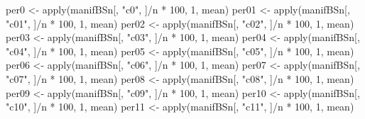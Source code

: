 \documentclass[
]{book}
\newenvironment{Shaded}{\begin{snugshade}}{\end{snugshade}}
\newcommand{\DecValTok}[1]{\textcolor[rgb]{0.00,0.00,0.81}{#1}}
\newcommand{\FunctionTok}[1]{\textcolor[rgb]{0.00,0.00,0.00}{#1}}
\newcommand{\NormalTok}[1]{#1}
\newcommand{\OtherTok}[1]{\textcolor[rgb]{0.56,0.35,0.01}{#1}}
\newcommand{\SpecialCharTok}[1]{\textcolor[rgb]{0.00,0.00,0.00}{#1}}
\newcommand{\StringTok}[1]{\textcolor[rgb]{0.31,0.60,0.02}{#1}}
\begin{document}
\begin{Shaded}
\begin{Highlighting}[]
\NormalTok{per0 }\OtherTok{\textless{}{-}} \FunctionTok{apply}\NormalTok{(manifBSn[, }\StringTok{"c0"}\NormalTok{, ]}\SpecialCharTok{/}\NormalTok{n }\SpecialCharTok{*} \DecValTok{100}\NormalTok{, }\DecValTok{1}\NormalTok{, mean)}
\NormalTok{per01 }\OtherTok{\textless{}{-}} \FunctionTok{apply}\NormalTok{(manifBSn[, }\StringTok{"c01"}\NormalTok{, ]}\SpecialCharTok{/}\NormalTok{n }\SpecialCharTok{*} \DecValTok{100}\NormalTok{, }\DecValTok{1}\NormalTok{, mean)}
\NormalTok{per02 }\OtherTok{\textless{}{-}} \FunctionTok{apply}\NormalTok{(manifBSn[, }\StringTok{"c02"}\NormalTok{, ]}\SpecialCharTok{/}\NormalTok{n }\SpecialCharTok{*} \DecValTok{100}\NormalTok{, }\DecValTok{1}\NormalTok{, mean)}
\NormalTok{per03 }\OtherTok{\textless{}{-}} \FunctionTok{apply}\NormalTok{(manifBSn[, }\StringTok{"c03"}\NormalTok{, ]}\SpecialCharTok{/}\NormalTok{n }\SpecialCharTok{*} \DecValTok{100}\NormalTok{, }\DecValTok{1}\NormalTok{, mean)}
\NormalTok{per04 }\OtherTok{\textless{}{-}} \FunctionTok{apply}\NormalTok{(manifBSn[, }\StringTok{"c04"}\NormalTok{, ]}\SpecialCharTok{/}\NormalTok{n }\SpecialCharTok{*} \DecValTok{100}\NormalTok{, }\DecValTok{1}\NormalTok{, mean)}
\NormalTok{per05 }\OtherTok{\textless{}{-}} \FunctionTok{apply}\NormalTok{(manifBSn[, }\StringTok{"c05"}\NormalTok{, ]}\SpecialCharTok{/}\NormalTok{n }\SpecialCharTok{*} \DecValTok{100}\NormalTok{, }\DecValTok{1}\NormalTok{, mean)}
\NormalTok{per06 }\OtherTok{\textless{}{-}} \FunctionTok{apply}\NormalTok{(manifBSn[, }\StringTok{"c06"}\NormalTok{, ]}\SpecialCharTok{/}\NormalTok{n }\SpecialCharTok{*} \DecValTok{100}\NormalTok{, }\DecValTok{1}\NormalTok{, mean)}
\NormalTok{per07 }\OtherTok{\textless{}{-}} \FunctionTok{apply}\NormalTok{(manifBSn[, }\StringTok{"c07"}\NormalTok{, ]}\SpecialCharTok{/}\NormalTok{n }\SpecialCharTok{*} \DecValTok{100}\NormalTok{, }\DecValTok{1}\NormalTok{, mean)}
\NormalTok{per08 }\OtherTok{\textless{}{-}} \FunctionTok{apply}\NormalTok{(manifBSn[, }\StringTok{"c08"}\NormalTok{, ]}\SpecialCharTok{/}\NormalTok{n }\SpecialCharTok{*} \DecValTok{100}\NormalTok{, }\DecValTok{1}\NormalTok{, mean)}
\NormalTok{per09 }\OtherTok{\textless{}{-}} \FunctionTok{apply}\NormalTok{(manifBSn[, }\StringTok{"c09"}\NormalTok{, ]}\SpecialCharTok{/}\NormalTok{n }\SpecialCharTok{*} \DecValTok{100}\NormalTok{, }\DecValTok{1}\NormalTok{, mean)}
\NormalTok{per10 }\OtherTok{\textless{}{-}} \FunctionTok{apply}\NormalTok{(manifBSn[, }\StringTok{"c10"}\NormalTok{, ]}\SpecialCharTok{/}\NormalTok{n }\SpecialCharTok{*} \DecValTok{100}\NormalTok{, }\DecValTok{1}\NormalTok{, mean)}
\NormalTok{per11 }\OtherTok{\textless{}{-}} \FunctionTok{apply}\NormalTok{(manifBSn[, }\StringTok{"c11"}\NormalTok{, ]}\SpecialCharTok{/}\NormalTok{n }\SpecialCharTok{*} \DecValTok{100}\NormalTok{, }\DecValTok{1}\NormalTok{, mean)}

\end{Highlighting}
\end{Shaded}
\end{document}
